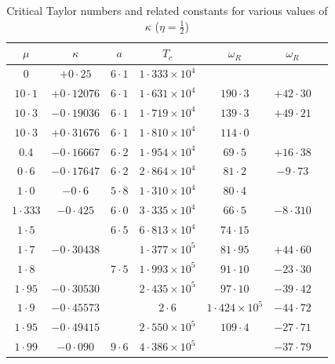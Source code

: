 \begin{table}[ht]
\centering
\caption{Critical Taylor numbers and related constants for various values of $\kappa$
  ($\eta = \frac{1}{2}$)}
\label{tab:XXXV}
\medskip
\small
\begin{tabular}{ccccccc}
\hline
$\mu$ & $\kappa$ & $a$ & $T_c$ & $\omega_R$ & $\omega_R$ \\
\hline
0       & $+0{\cdot}25$ & $6{\cdot}1$ & $1{\cdot}333\times10^4$ &         & \\
$10{\cdot}1$   & $+0{\cdot}12076$ & $6{\cdot}1$ & $1{\cdot}631\times10^4$ & $190{\cdot}3$ & $+42{\cdot}30$ \\
$10{\cdot}3$   & $-0{\cdot}19036$ & $6{\cdot}1$ & $1{\cdot}719\times10^4$ & $139{\cdot}3$ & $+49{\cdot}21$ \\
$10{\cdot}3$   & $+0{\cdot}31676$ & $6{\cdot}1$ & $1{\cdot}810\times10^4$ & $114{\cdot}0$ & \\
0.4     & $-0{\cdot}16667$ & $6{\cdot}2$ & $1{\cdot}954\times10^4$ & $69{\cdot}5$ & $+16{\cdot}38$ \\
$0{\cdot}6$ & $-0{\cdot}17647$ & $6{\cdot}2$ & $2{\cdot}864\times10^4$ & $81{\cdot}2$ & $-9{\cdot}73$ \\
\hline
$1{\cdot}0$ & $-0{\cdot}6$ & $5{\cdot}8$ & $1{\cdot}310\times10^4$ & $80{\cdot}4$ & \\
\hline
$1{\cdot}333$ & $-0{\cdot}425$ & $6{\cdot}0$ & $3{\cdot}335\times10^4$ & $66{\cdot}5$ & $-8{\cdot}310$ \\
$1{\cdot}5$ & & $6{\cdot}5$ & $6{\cdot}813\times10^4$ & $74{\cdot}15$ & \\
\hline
$1{\cdot}7$ & $-0{\cdot}30438$ & & $1{\cdot}377\times10^5$ & $81{\cdot}95$ & $+44{\cdot}60$ \\
$1{\cdot}8$ & & $7{\cdot}5$ & $1{\cdot}993\times10^5$ & $91{\cdot}10$ & $-23{\cdot}30$ \\
\hline
$1{\cdot}95$ & $-0{\cdot}30530$ & & $2{\cdot}435\times10^5$ & $97{\cdot}10$ & $-39{\cdot}42$ \\
$1{\cdot}9$ & $-0{\cdot}45573$ & & $2{\cdot}6$ & $1{\cdot}424\times10^5$ & $-44{\cdot}72$ \\
\hline
$1{\cdot}95$ & $-0{\cdot}49415$ & & $2{\cdot}550\times10^5$ & $109{\cdot}4$ & $-27{\cdot}71$ \\
$1{\cdot}99$ & $-0{\cdot}090$ & $9{\cdot}6$ & $4{\cdot}386\times10^5$ & & $-37{\cdot}79$ \\
\hline
\end{tabular}
\end{table}

